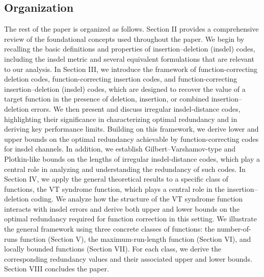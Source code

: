 \documentclass[11 pt]{article}
\numberwithin{equation}{section}
\begin{document}
    \subsection{Organization}
    The rest of the paper is organized as follows. Section II provides a comprehensive review of the foundational concepts used throughout the paper. We begin by recalling the basic definitions and properties of insertion–deletion (insdel) codes, including the insdel metric and several equivalent formulations that are relevant to our analysis. In Section III, we introduce the framework of function-correcting deletion codes, function-correcting insertion codes, and function-correcting insertion–deletion (insdel) codes, which are designed to recover the value of a target function in the presence of deletion, insertion, or combined insertion–deletion errors. We then present and discuss irregular insdel-distance codes, highlighting their significance in characterizing optimal redundancy and in deriving key performance limits. Building on this framework, we derive lower and upper bounds on the optimal redundancy achievable by function-correcting codes for insdel channels. In addition, we establish Gilbert–Varshamov-type and Plotkin-like bounds on the lengths of irregular insdel-distance codes, which play a central role in analyzing and understanding the redundancy of such codes. In Section IV, we apply the general theoretical results to a specific class of functions, the VT syndrome function, which plays a central role in the insertion–deletion coding. We analyze how the structure of the VT syndrome function interacts with insdel errors and derive both upper and lower bounds on the optimal redundancy required for function correction in this setting. We illustrate the general framework using three concrete classes of functions: the number-of-runs function (Section V), the maximum-run-length function (Section VI), and locally bounded functions (Section VII). For each class, we derive the corresponding redundancy values and their associated upper and lower bounds. Section VIII concludes the paper.   
\end{document}
